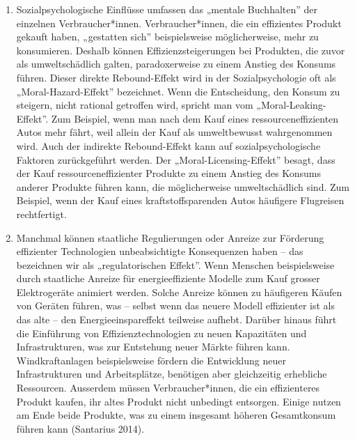 \documentclass[
  nswissgerman,
  a4paper,
  openany]{book}
\begin{document}
\begin{enumerate}
\def\labelenumi{\arabic{enumi}.}
\setcounter{enumi}{1}
\item
  Sozialpsychologische Einflüsse umfassen das „mentale Buchhalten'' der
  einzelnen Verbraucher*innen. Verbraucher*innen, die ein effizientes
  Produkt gekauft haben, „gestatten sich'' beispielsweise
  möglicherweise, mehr zu konsumieren. Deshalb können
  Effizienzsteigerungen bei Produkten, die zuvor als umweltschädlich
  galten, paradoxerweise zu einem Anstieg des Konsums führen. Dieser
  direkte Rebound-Effekt wird in der Sozialpsychologie oft als
  „Moral-Hazard-Effekt'' bezeichnet. Wenn die Entscheidung, den Konsum
  zu steigern, nicht rational getroffen wird, spricht man vom
  „Moral-Leaking-Effekt''. Zum Beispiel, wenn man nach dem Kauf eines
  ressourceneffizienten Autos mehr fährt, weil allein der Kauf als
  umweltbewusst wahrgenommen wird. Auch der indirekte Rebound-Effekt
  kann auf sozialpsychologische Faktoren zurückgeführt werden. Der
  „Moral-Licensing-Effekt'' besagt, dass der Kauf ressourceneffizienter
  Produkte zu einem Anstieg des Konsums anderer Produkte führen kann,
  die möglicherweise umweltschädlich sind. Zum Beispiel, wenn der Kauf
  eines kraftstoffsparenden Autos häufigere Flugreisen rechtfertigt.
\item
  Manchmal können staatliche Regulierungen oder Anreize zur Förderung
  effizienter Technologien unbeabsichtigte Konsequenzen haben -- das
  bezeichnen wir als „regulatorischen Effekt''. Wenn Menschen
  beispielsweise durch staatliche Anreize für energieeffiziente Modelle
  zum Kauf grosser Elektrogeräte animiert werden. Solche Anreize können
  zu häufigeren Käufen von Geräten führen, was -- selbst wenn das neuere
  Modell effizienter ist als das alte -- den Energieeinspareffekt
  teilweise aufhebt. Darüber hinaus führt die Einführung von
  Effizienztechnologien zu neuen Kapazitäten und Infrastrukturen, was
  zur Entstehung neuer Märkte führen kann. Windkraftanlagen
  beispielsweise fördern die Entwicklung neuer Infrastrukturen und
  Arbeitsplätze, benötigen aber gleichzeitig erhebliche Ressourcen.
  Ausserdem müssen Verbraucher*innen, die ein effizienteres Produkt
  kaufen, ihr altes Produkt nicht unbedingt entsorgen. Einige nutzen am
  Ende beide Produkte, was zu einem insgesamt höheren Gesamtkonsum
  führen kann (Santarius 2014).
\end{enumerate}
\end{document}

